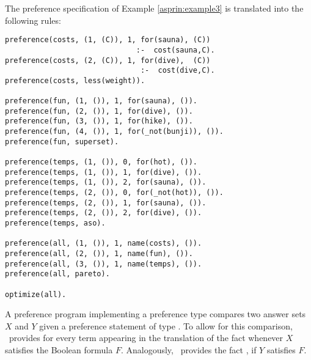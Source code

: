 \begin{example}
The preference specification of Example \ref{asprin:example3} is translated into the following rules:
\begin{lstlisting}[numbers=none,escapechar=?]
preference(costs, (1, (C)), 1, for(sauna), (C))  
                              :-  cost(sauna,C).
preference(costs, (2, (C)), 1, for(dive),  (C))
                               :-  cost(dive,C).
preference(costs, less(weight)).

preference(fun, (1, ()), 1, for(sauna), ()).
preference(fun, (2, ()), 1, for(dive), ()).
preference(fun, (3, ()), 1, for(hike), ()).
preference(fun, (4, ()), 1, for(_not(bunji)), ()).
preference(fun, superset).

preference(temps, (1, ()), 0, for(hot), ()).
preference(temps, (1, ()), 1, for(dive), ()).
preference(temps, (1, ()), 2, for(sauna), ()).
preference(temps, (2, ()), 0, for(_not(hot)), ()).
preference(temps, (2, ()), 1, for(sauna), ()).
preference(temps, (2, ()), 2, for(dive), ()).
preference(temps, aso).

preference(all, (1, ()), 1, name(costs), ()).
preference(all, (2, ()), 1, name(fun), ()).
preference(all, (3, ()), 1, name(temps), ()).
preference(all, pareto).

optimize(all).
\end{lstlisting}
\end{example}


A preference program implementing a preference type 
compares two answer sets $X$ and $Y$
given a preference statement  of type . %
To allow for this comparison, 
\asprin\ provides
for every term  appearing in the translation of 
the fact  
whenever $X$ satisfies the Boolean formula $F$.
Analogously, \asprin\ provides the fact , if $Y$ satisfies $F$.

